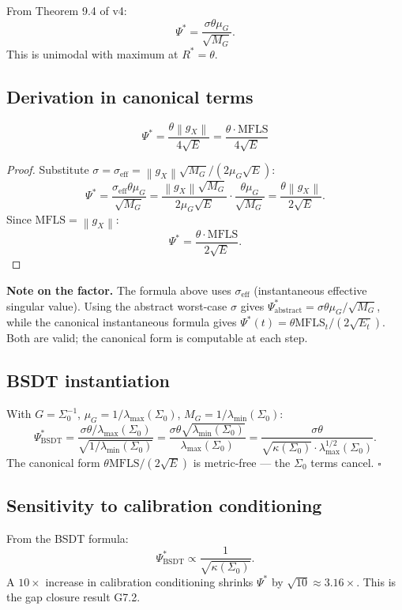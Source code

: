 \documentclass[11pt,a4paper]{article}
\theoremstyle{definition}
\newcommand{\norm}[1]{\left\|#1\right\|}
\newcommand{\gX}{g_X}
\newcommand{\mfls}{\mathrm{MFLS}}
\newcommand{\bsdt}{\mathrm{BSDT}}
\begin{document}
From Theorem 9.4 of v4:
\[
\Psi^* = \frac{\sigma\theta\mu_G}{\sqrt{M_G}}.
\]
This is unimodal with maximum at $R^* = \theta$.

\subsection{Derivation in canonical terms}

\begin{lockedbox}
\[
\Psi^* = \frac{\theta\norm{\gX}}{4\sqrt{E}} = \frac{\theta\cdot\mfls}{4\sqrt{E}}
\]
\end{lockedbox}

\begin{proof}
Substitute $\sigma = \sigma_\mathrm{eff} = \norm{\gX}\sqrt{M_G}/(2\mu_G\sqrt{E})$:
\[
\Psi^* = \frac{\sigma_\mathrm{eff}\theta\mu_G}{\sqrt{M_G}}
= \frac{\norm{\gX}\sqrt{M_G}}{2\mu_G\sqrt{E}}\cdot\frac{\theta\mu_G}{\sqrt{M_G}}
= \frac{\theta\norm{\gX}}{2\sqrt{E}}.
\]
Since $\mfls = \norm{\gX}$:
\[
\Psi^* = \frac{\theta\cdot\mfls}{2\sqrt{E}}.
\]
\end{proof}

\textbf{Note on the factor.} The formula above uses $\sigma_\mathrm{eff}$ (instantaneous effective singular value). Using the abstract worst-case $\sigma$ gives $\Psi^*_\text{abstract} = \sigma\theta\mu_G/\sqrt{M_G}$, while the canonical instantaneous formula gives $\Psi^*(t) = \theta\mfls_t/(2\sqrt{E_t})$. Both are valid; the canonical form is computable at each step.

\subsection{BSDT instantiation}

With $G = \Sigma_0^{-1}$, $\mu_G = 1/\lambda_\mathrm{max}(\Sigma_0)$, $M_G = 1/\lambda_\mathrm{min}(\Sigma_0)$:
\[
\Psi^*_\bsdt = \frac{\sigma\theta/\lambda_\mathrm{max}(\Sigma_0)}{\sqrt{1/\lambda_\mathrm{min}(\Sigma_0)}}
= \frac{\sigma\theta\sqrt{\lambda_\mathrm{min}(\Sigma_0)}}{\lambda_\mathrm{max}(\Sigma_0)}
= \frac{\sigma\theta}{\sqrt{\kappa(\Sigma_0)}\cdot\lambda_\mathrm{max}^{1/2}(\Sigma_0)}.
\]
The canonical form $\theta\mfls/(2\sqrt{E})$ is metric-free — the $\Sigma_0$ terms cancel. $\square$

\subsection{Sensitivity to calibration conditioning}

From the BSDT formula:
\[
\Psi^*_\bsdt \propto \frac{1}{\sqrt{\kappa(\Sigma_0)}}.
\]
A $10\times$ increase in calibration conditioning shrinks $\Psi^*$ by $\sqrt{10} \approx 3.16\times$.
This is the gap closure result G7.2.
\end{document}
